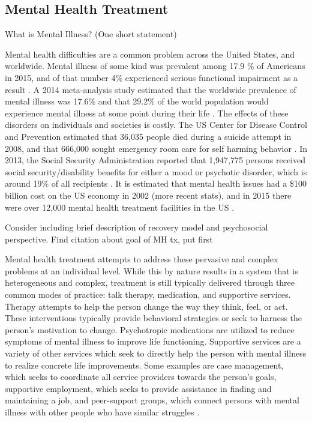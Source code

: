 \documentclass[sigconf]{acmart}
\begin{document}
\subsection{Mental Health Treatment}
What is Mental Illness? (One short statement)

Mental health difficulties are a common problem across the United States, and worldwide. Mental illness of some kind was prevalent among 17.9 \% of Americans in 2015, and of that number 4\% experienced serious functional impairment as a result \cite{nihmstats}. A 2014 meta-analysis study estimated that the worldwide prevalence of mental illness was 17.6\% and that 29.2\% of the world population would experience mental illness at some point during their life \cite{worldprev}. The effects of these disorders on individuals and societies is costly. The US Center for Disease Control and Prevention estimated that 36,035 people died during a suicide attempt in 2008, and that 666,000 sought emergency room care for self harming behavior \cite{cdcsuicide}. In 2013, the Social Security Administration reported that 1,947,775 persons received social security/disability benefits for either a mood or psychotic disorder, which is around 19\% of all recipients \cite{ssarecipients}. It is estimated that mental health issues had a \$100 billion cost on the US economy in 2002 \cite{nihmstats} (more recent stats), and in 2015 there were over 12,000 mental health treatment facilities in the US \cite{n-mhss2015}.

Consider including brief description of recovery model and psychosocial perspective. Find citation about goal of MH tx, put first

Mental health treatment attempts to address these pervasive and complex problems at an individual level. While this by nature results in a system that is heterogeneous and complex, treatment is still typically delivered through three common modes of practice: talk therapy, medication, and supportive services. Therapy attempts to help the person change the way they think, feel, or act. These interventions typically provide behavioral strategies or seek to harness the person's motivation to change. Psychotropic medications are utilized to reduce symptoms of mental illness to improve life functioning. Supportive services are a variety of other services which seek to directly help the person with mental illness to realize concrete life improvements. Some examples are case management, which seeks to coordinate all service providers towards the person's goals, supportive employment, which seeks to provide assistance in finding and maintaining a job, and peer-support groups, which connect persons with mental illness with other people who have similar struggles \cite{samhsatx}.
\end{document}
